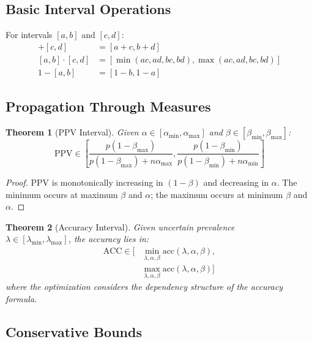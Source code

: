 \documentclass[11pt]{article}
\newcommand{\PPV}{\text{PPV}} %
\newcommand{\ACC}{\text{ACC}} %
\newcommand{\Interval}[2]{[#1, #2]} %
\newtheorem{theorem}{Theorem}[section]
\begin{document}
\subsection{Basic Interval Operations}

For intervals $\Interval{a}{b}$ and $\Interval{c}{d}$:
\begin{align}
\Interval{a}{b} + \Interval{c}{d} &= \Interval{a+c}{b+d} \\
\Interval{a}{b} \cdot \Interval{c}{d} &= \Interval{\min(ac,ad,bc,bd)}{\max(ac,ad,bc,bd)} \\
1 - \Interval{a}{b} &= \Interval{1-b}{1-a}
\end{align}

\subsection{Propagation Through Measures}

\begin{theorem}[PPV Interval]
Given $\alpha \in \Interval{\alpha_{\min}}{\alpha_{\max}}$ and $\beta \in \Interval{\beta_{\min}}{\beta_{\max}}$:
\[
\PPV \in \Interval{\frac{p(1-\beta_{\max})}{p(1-\beta_{\max}) + n\alpha_{\max}}}{\frac{p(1-\beta_{\min})}{p(1-\beta_{\min}) + n\alpha_{\min}}}
\]
\end{theorem}

\begin{proof}
PPV is monotonically increasing in $(1-\beta)$ and decreasing in $\alpha$. The minimum occurs at maximum $\beta$ and $\alpha$; the maximum occurs at minimum $\beta$ and $\alpha$.
\end{proof}

\begin{theorem}[Accuracy Interval]
Given uncertain prevalence\\ $\lambda \in \Interval{\lambda_{\min}}{\lambda_{\max}}$, the accuracy lies in:
\begin{align}
\ACC \in \bigg[&\min_{\lambda,\alpha,\beta} \text{acc}(\lambda,\alpha,\beta),\nonumber\\
&\max_{\lambda,\alpha,\beta} \text{acc}(\lambda,\alpha,\beta)\bigg]
\end{align}
where the optimization considers the dependency structure of the accuracy formula.
\end{theorem}

\subsection{Conservative Bounds}
\end{document}
